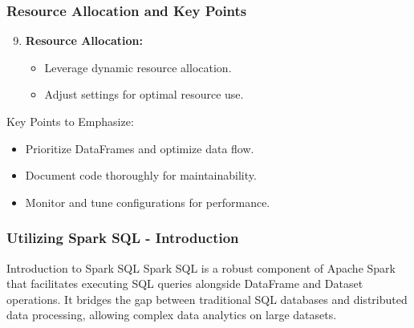 \documentclass[aspectratio=169]{beamer}
\begin{document}
\begin{frame}[fragile]
    \frametitle{Resource Allocation and Key Points}
    \begin{enumerate}
        \setcounter{enumi}{8}
        \item \textbf{Resource Allocation:}
        \begin{itemize}
            \item Leverage dynamic resource allocation.
            \item Adjust settings for optimal resource use.
        \end{itemize}
    \end{enumerate}
    
    \begin{block}{Key Points to Emphasize:}
        \begin{itemize}
            \item Prioritize DataFrames and optimize data flow.
            \item Document code thoroughly for maintainability.
            \item Monitor and tune configurations for performance.
        \end{itemize}
    \end{block}
\end{frame}

\begin{frame}[fragile]
    \frametitle{Utilizing Spark SQL - Introduction}
    \begin{block}{Introduction to Spark SQL}
        Spark SQL is a robust component of Apache Spark that facilitates executing SQL queries alongside DataFrame and Dataset operations. 
        It bridges the gap between traditional SQL databases and distributed data processing, allowing complex data analytics on large datasets.
    \end{block}
\end{frame}
\end{document}
